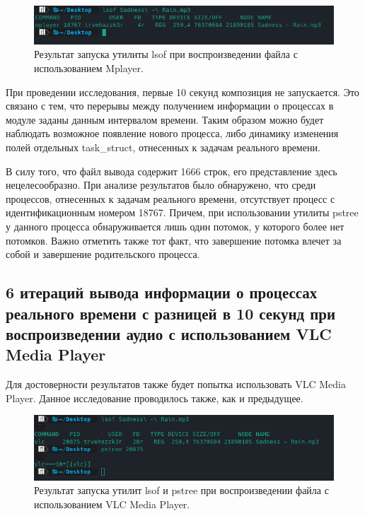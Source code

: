 \begin{figure}[H]
	\centering
	\includegraphics[scale=0.8]{img/mplayerlsof.png}
	\caption{Результат запуска утилиты lsof при воспроизведении файла с использованием Mplayer.}
	\label{fig:mplayerlsof}
\end{figure}

При проведении исследования, первые 10 секунд композиция не запускается. Это связано с тем, что перерывы между получением информации о процессах в модуле заданы данным интервалом времени. Таким образом можно будет наблюдать возможное появление нового процесса, либо динамику изменения полей отдельных task\_struct, отнесенных к задачам реального времени.

В силу того, что файл вывода содержит 1666 строк, его представление здесь нецелесообразно. При анализе результатов было обнаружено, что среди процессов, отнесенных к задачам реального времени, отсутствует процесс с идентификационным номером 18767. Причем, при использовании утилиты pstree у данного процесса обнаруживается лишь один потомок, у которого более нет потомков. Важно отметить также тот факт, что завершение потомка влечет за собой и завершение родительского процесса.

\subsection{6 итераций вывода информации о процессах реального времени с разницей в 10 секунд при воспроизведении аудио с использованием VLC Media Player}
Для достоверности результатов также будет попытка использовать VLC Media Player. Данное исследование проводилось также, как и предыдущее.

\begin{figure}[H]
	\centering
	\includegraphics[scale=0.8]{img/vlclsof.png}
	\caption{Результат запуска утилит lsof и pstree при воспроизведении файла с использованием VLC Media Player.}
	\label{fig:vlclsof}
\end{figure}

